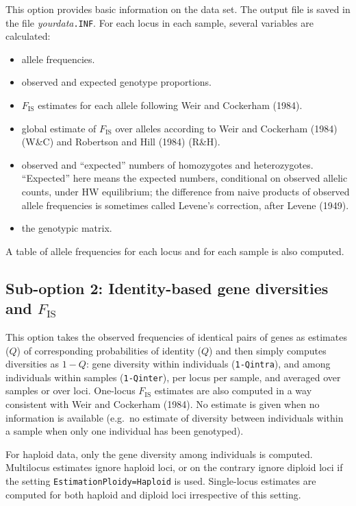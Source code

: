 \documentclass[12pt,]{book}
\begin{document}
This option provides basic information on the data set. The output file
is saved in the file \emph{yourdata}\texttt{.INF}. For each locus in
each sample, several variables are calculated:

\begin{itemize}
\item
  allele frequencies.
\item
  observed and expected genotype proportions.
\item
  \(F_\mathrm{IS}\) estimates for each allele following Weir and
  Cockerham (1984).
\item
  global estimate of \(F_\mathrm{IS}\) over alleles according to Weir
  and Cockerham (1984) (W\&C) and Robertson and Hill (1984) (R\&H).
\item
  observed and ``expected'' numbers of homozygotes and heterozygotes.
  ``Expected'' here means the expected numbers, conditional on observed
  allelic counts, under HW equilibrium; the difference from naive
  products of observed allele frequencies is sometimes called Levene's
  correction, after Levene (1949).
\item
  the genotypic matrix.
\end{itemize}

A table of allele frequencies for each locus and for each sample is also
computed.

\subsection{\texorpdfstring{Sub-option 2: Identity-based gene
diversities and
\(F_\mathrm{IS}\)}{Sub-option 2: Identity-based gene diversities and F\_\textbackslash{}mathrm\{IS\}}}\label{sub-option-2-identity-based-gene-diversities-and-f_mathrmis}

This option takes the observed frequencies of identical pairs of genes
as estimates (\(Q\)) of corresponding probabilities of identity (\(Q\))
and then simply computes diversities as \(1-Q\): gene diversity within
individuals (\texttt{1-Qintra}), and among individuals within samples
(\texttt{1-Qinter}), per locus per sample, and averaged over samples or
over loci. One-locus \(F_\mathrm{IS}\) estimates are also computed in a
way consistent with Weir and Cockerham (1984). No estimate is given when
no information is available (e.g.~no estimate of diversity between
individuals within a sample when only one individual has been
genotyped).

For haploid data, only the gene diversity among
individuals is computed. Multilocus estimates ignore haploid loci, or on
the contrary ignore diploid loci if the setting
\texttt{EstimationPloidy=Haploid} is used. Single-locus estimates are
computed for both haploid and diploid loci irrespective of this setting.
\end{document}
